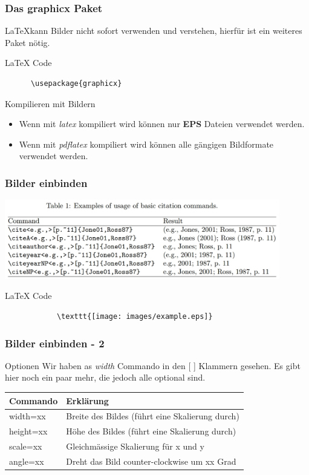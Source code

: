 \begin{frame}[fragile]
  \frametitle{Das graphicx Paket}

  \LaTeX kann Bilder nicht sofort verwenden und verstehen, hierfür ist ein weiteres Paket nötig.
  \pause
  \begin{block}{LaTeX Code}
    \begin{verbatim}
      \usepackage{graphicx}
    \end{verbatim}
  \end{block}
  \pause
  \begin{block}{Kompilieren mit Bildern}
    \begin{itemize}
      \item Wenn mit \textit{latex} kompiliert wird können nur \textbf{EPS} Dateien verwendet werden.
      \item Wenn mit \textit{pdflatex} kompiliert wird können alle gängigen Bildformate verwendet werden.
    \end{itemize}
  \end{block}
\end{frame}

\begin{frame}[fragile]
  \frametitle{Bilder einbinden}

  \begin{example}
    \includegraphics[width = 0.9\textwidth]{images/Auswahl_047.eps}
  \end{example}
	\pause
	\begin{block}{LaTeX Code}
		\begin{verbatim}
			\texttt{[image: images/example.eps]}
		\end{verbatim}
	\end{block}
\end{frame}
\begin{frame}[fragile]
  \frametitle{Bilder einbinden - 2}

	\begin{block}{Optionen}
		Wir haben as \textit{width} Commando in den [ ] Klammern gesehen. Es gibt hier noch ein paar mehr, die jedoch alle optional sind.

		\begin{tabular}{|l|l|}
			\textbf{Commando} & \textbf{Erklärung} \\
			\hline\hline
			width=xx & Breite des Bildes (führt eine Skalierung durch) \\\hline
			height=xx & Höhe des Bildes (führt eine Skalierung durch) \\\hline
			scale=xx & Gleichmässige Skalierung für x und y \\\hline
			angle=xx & Dreht das Bild counter-clockwise um xx Grad \\\hline
		\end{tabular}
	\end{block}
\end{frame}

